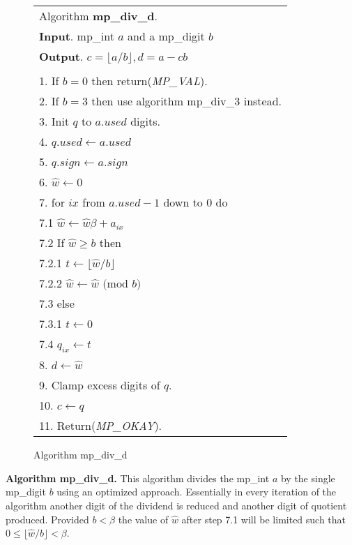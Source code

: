 \documentclass[b5paper]{book}
\begin{document}
\newpage\begin{figure}[!here]
\begin{small}
\begin{center}
\begin{tabular}{l}
\hline Algorithm \textbf{mp\_div\_d}. \\
\textbf{Input}.   mp\_int $a$ and a mp\_digit $b$ \\
\textbf{Output}.  $c = \lfloor a / b \rfloor, d = a - cb$ \\
\hline \\
1.  If $b = 0$ then return(\textit{MP\_VAL}).\\
2.  If $b = 3$ then use algorithm mp\_div\_3 instead. \\
3.  Init $q$ to $a.used$ digits.  \\
4.  $q.used \leftarrow a.used$ \\
5.  $q.sign \leftarrow a.sign$ \\
6.  $\hat w \leftarrow 0$ \\
7.  for $ix$ from $a.used - 1$ down to $0$ do \\
\hspace{3mm}7.1  $\hat w \leftarrow \hat w \beta + a_{ix}$ \\
\hspace{3mm}7.2  If $\hat w \ge b$ then \\
\hspace{6mm}7.2.1  $t \leftarrow \lfloor \hat w / b \rfloor$ \\
\hspace{6mm}7.2.2  $\hat w \leftarrow \hat w \mbox{ (mod }b\mbox{)}$ \\
\hspace{3mm}7.3  else\\
\hspace{6mm}7.3.1  $t \leftarrow 0$ \\
\hspace{3mm}7.4  $q_{ix} \leftarrow t$ \\
8.  $d \leftarrow \hat w$ \\
9.  Clamp excess digits of $q$. \\
10.  $c \leftarrow q$ \\
11.  Return(\textit{MP\_OKAY}). \\
\hline
\end{tabular}
\end{center}
\end{small}
\caption{Algorithm mp\_div\_d}
\end{figure}
\textbf{Algorithm mp\_div\_d.}
This algorithm divides the mp\_int $a$ by the single mp\_digit $b$ using an optimized approach.  Essentially in every iteration of the
algorithm another digit of the dividend is reduced and another digit of quotient produced.  Provided $b < \beta$ the value of $\hat w$
after step 7.1 will be limited such that $0 \le \lfloor \hat w / b \rfloor < \beta$.  
\end{document}
